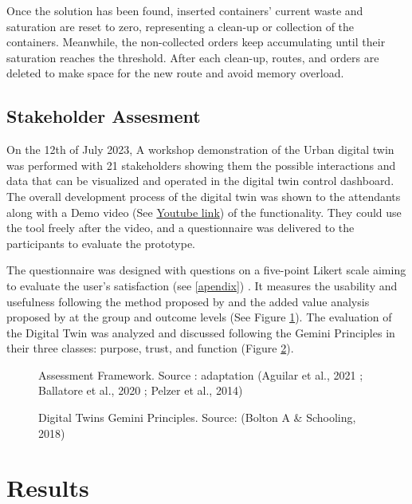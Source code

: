 \documentclass[authoryear,preprint,review,12pt]{elsarticle}
\begin{document}
    Once the solution has been found, inserted containers’ current waste and saturation are reset to zero, representing a clean-up or collection of the containers. Meanwhile, the non-collected orders keep accumulating until their saturation reaches the threshold. After each clean-up, routes, and orders are deleted to make space for the new route and avoid memory overload.

    \subsection{Stakeholder Assesment} \label{sub:MethAssesment}

    On the 12th of July 2023, A workshop demonstration of the Urban digital twin was performed with 21 stakeholders showing them the possible interactions and data that can be visualized and operated in the digital twin control dashboard. The overall development process of the digital twin was shown to the attendants along with a Demo video (See \href{https://www.youtube.com/embed/6k209psuRqw}{Youtube link}) of the functionality. They could use the tool freely after the video, and a questionnaire was delivered to the participants to evaluate the prototype.

    The questionnaire was designed with questions on a five-point Likert scale aiming to evaluate the user’s satisfaction (see \ref{apendix}) . It measures the usability and usefulness following the method proposed by \citet{Ballatore2020} and the added value analysis proposed by \citet{Pelzer2014}at the group and outcome levels (See Figure \ref{fig:AssesmentFr}). The evaluation of the Digital Twin was analyzed and discussed following the Gemini Principles \citep{aGeminiPrinciplesGuiding2018} in their three classes: purpose, trust, and function (Figure \ref{fig:DTPrinciples}).

    \begin{figure}[h]
        \caption{Assessment Framework.
        Source : adaptation (Aguilar et al., 2021 ; Ballatore et al., 2020 ; Pelzer et al., 2014)}
        \label{fig:AssesmentFr}
    \end{figure}

    \begin{figure}
        \caption{Digital Twins Gemini Principles. Source: (Bolton A \& Schooling, 2018)}
        \label{fig:DTPrinciples}
    \end{figure}

    \section{Results}
\end{document}
